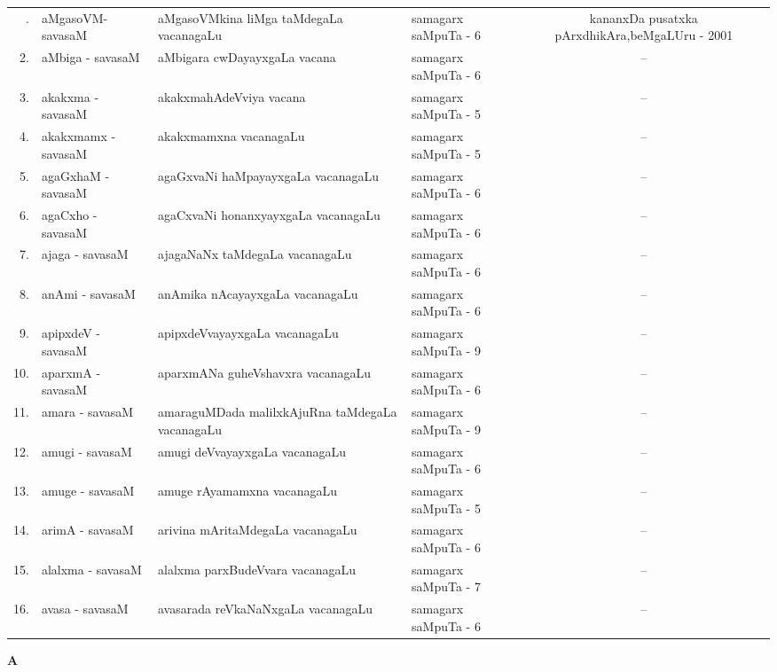 {\renewcommand{\arraystretch}{1.35}
\begin{longtable}{rl>{\raggedright}p{5.5cm}lc}
\endfirsthead
\endhead
\endfoot
\endlastfoot
1. & aMgasoVM-savasaM & aMgasoVMkina liMga taMdegaLa vacanagaLu & samagarx saMpuTa - 6 & \multicolumn{1}{p{3.5cm}}{kananxDa pusatxka pArxdhikAra,\newline beMgaLUru - 2001}\\
2. & aMbiga - savasaM & aMbigara cwDayayxgaLa vacana & samagarx saMpuTa - 6 & --\\
3. & akakxma - savasaM & akakxmahAdeVviya vacana & samagarx saMpuTa - 5 & --\\
4. & akakxmamx - savasaM & akakxmamxna vacanagaLu & samagarx saMpuTa - 5 & --\\
5. & agaGxhaM - savasaM & agaGxvaNi haMpayayxgaLa vacanagaLu & samagarx saMpuTa - 6 & --\\
6. & agaCxho - savasaM & agaCxvaNi honanxyayxgaLa vacanagaLu & samagarx saMpuTa - 6 & --\\
7. & ajaga - savasaM & ajagaNaNx taMdegaLa vacanagaLu & samagarx saMpuTa - 6 & --\\
8. & anAmi - savasaM & anAmika nAcayayxgaLa vacanagaLu & samagarx saMpuTa - 6 & --\\
9. & apipxdeV - savasaM & apipxdeVvayayxgaLa vacanagaLu & samagarx saMpuTa - 9 & --\\
10. & aparxmA - savasaM & aparxmANa guheVshavxra vacanagaLu & samagarx saMpuTa - 6 & --\\
11. & amara - savasaM & amaraguMDada malilxkAjuRna taMdegaLa vacanagaLu & samagarx saMpuTa - 9 & --\\
12. & amugi - savasaM & amugi deVvayayxgaLa vacanagaLu & samagarx saMpuTa - 6 & --\\
13. & amuge - savasaM & amuge rAyamamxna vacanagaLu & samagarx saMpuTa - 5 & --\\
14. & arimA - savasaM & arivina mAritaMdegaLa vacanagaLu & samagarx saMpuTa - 6 & --\\
15. & alalxma - savasaM & alalxma parxBudeVvara vacanagaLu & samagarx saMpuTa - 7 & --\\
16. & avasa - savasaM &  avasarada reVkaNaNxgaLa vacanagaLu & samagarx saMpuTa - 6 & --\\
\end{longtable}}
\bigskip

\centerline{\bf A}

\medskip


